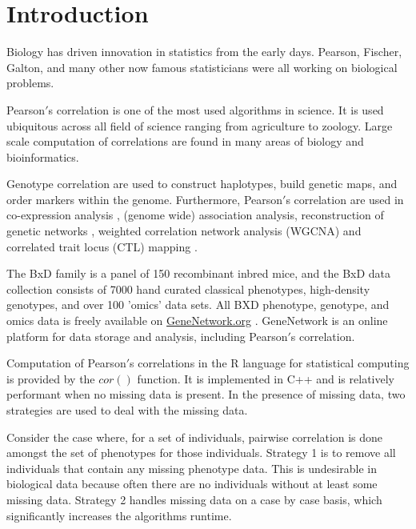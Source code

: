\documentclass{bioinfo}
\begin{document}
\maketitle

\section{Introduction}
Biology has driven innovation in statistics from the early days. Pearson, Fischer, 
Galton, and many other now famous statisticians were all working on biological 
problems. 

\enlargethispage{12pt}

Pearson$'$s correlation is one of the most used algorithms in science. It is used 
ubiquitous across all field of science ranging from agriculture to zoology. Large 
scale computation of correlations are found in many areas of biology and 
bioinformatics. 

Genotype correlation are used to construct haplotypes, build genetic maps, and 
order markers within the genome. Furthermore, Pearson$'$s correlation are used in 
co-expression analysis \citep{Tesson:2010}, (genome wide) association analysis, 
reconstruction of genetic networks \citep{Fukushima:2013}, weighted correlation 
network analysis (WGCNA) \citep{Horvath:2008} and correlated trait locus (CTL) 
mapping \citep{Arends2016a}.

The BxD family is a panel of 150 recombinant inbred mice, and the BxD data collection 
consists of 7000 hand curated classical phenotypes, high-density genotypes, and over 
100 'omics' data sets. All BXD phenotype, genotype, and omics data is freely available on 
\href{https://genenetwork.org/}{GeneNetwork.org} \citep{Sloan2016}. GeneNetwork is an 
online platform for data storage and analysis, including Pearson$'$s correlation.

Computation of Pearson$'$s correlations in the R language for statistical computing 
\citep{R:2005} is provided by the $cor()$ function. It is implemented in C++ and is 
relatively performant when no missing data is present. In the presence of missing 
data, two strategies are used to deal with the missing data.

Consider the case where, for a set of individuals, pairwise correlation is done 
amongst the set of phenotypes for those individuals. Strategy 1 is to remove 
all individuals that contain any missing phenotype data. This is undesirable in 
biological data because often there are no individuals without at least some 
missing data. Strategy 2 handles missing data on a case by case basis, 
which significantly increases the algorithms runtime.
\end{document}
